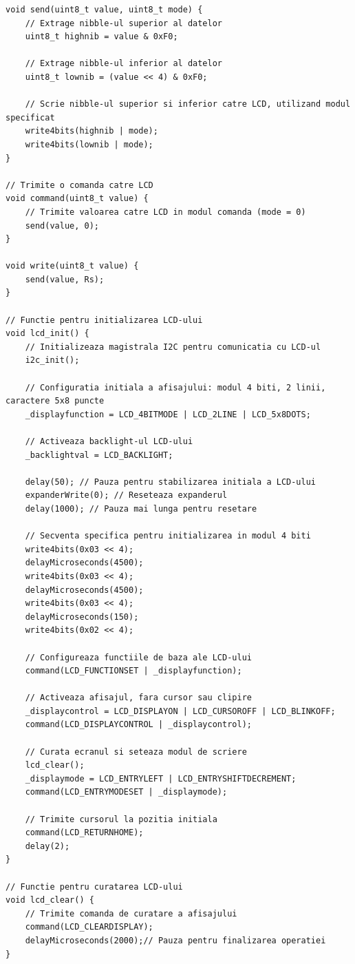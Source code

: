 \documentclass[a4paper,12pt]{report}
\begin{document}
\begin{lstlisting}
void send(uint8_t value, uint8_t mode) {
    // Extrage nibble-ul superior al datelor
    uint8_t highnib = value & 0xF0;
    
    // Extrage nibble-ul inferior al datelor
    uint8_t lownib = (value << 4) & 0xF0;
    
    // Scrie nibble-ul superior si inferior catre LCD, utilizand modul specificat
    write4bits(highnib | mode);
    write4bits(lownib | mode);
}

// Trimite o comanda catre LCD
void command(uint8_t value) {
    // Trimite valoarea catre LCD in modul comanda (mode = 0)
    send(value, 0);
}

void write(uint8_t value) {
    send(value, Rs);
}

// Functie pentru initializarea LCD-ului
void lcd_init() {
    // Initializeaza magistrala I2C pentru comunicatia cu LCD-ul
    i2c_init();

    // Configuratia initiala a afisajului: modul 4 biti, 2 linii, caractere 5x8 puncte
    _displayfunction = LCD_4BITMODE | LCD_2LINE | LCD_5x8DOTS;

    // Activeaza backlight-ul LCD-ului
    _backlightval = LCD_BACKLIGHT;

    delay(50); // Pauza pentru stabilizarea initiala a LCD-ului
    expanderWrite(0); // Reseteaza expanderul
    delay(1000); // Pauza mai lunga pentru resetare

    // Secventa specifica pentru initializarea in modul 4 biti
    write4bits(0x03 << 4);
    delayMicroseconds(4500);
    write4bits(0x03 << 4);
    delayMicroseconds(4500);
    write4bits(0x03 << 4);
    delayMicroseconds(150);
    write4bits(0x02 << 4);

    // Configureaza functiile de baza ale LCD-ului
    command(LCD_FUNCTIONSET | _displayfunction);

    // Activeaza afisajul, fara cursor sau clipire
    _displaycontrol = LCD_DISPLAYON | LCD_CURSOROFF | LCD_BLINKOFF;
    command(LCD_DISPLAYCONTROL | _displaycontrol);

    // Curata ecranul si seteaza modul de scriere
    lcd_clear();
    _displaymode = LCD_ENTRYLEFT | LCD_ENTRYSHIFTDECREMENT;
    command(LCD_ENTRYMODESET | _displaymode);

    // Trimite cursorul la pozitia initiala
    command(LCD_RETURNHOME);
    delay(2);
}

// Functie pentru curatarea LCD-ului
void lcd_clear() {
    // Trimite comanda de curatare a afisajului
    command(LCD_CLEARDISPLAY);
    delayMicroseconds(2000);// Pauza pentru finalizarea operatiei
}


\end{lstlisting}
\end{document}
